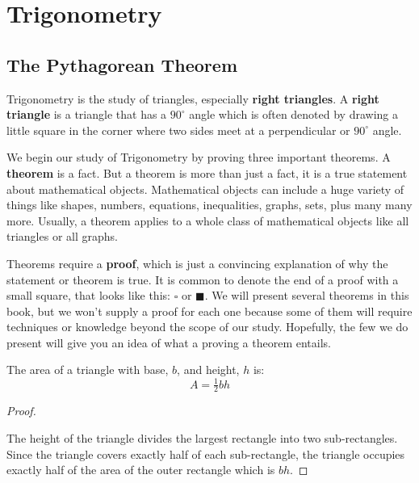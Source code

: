\chapter{Trigonometry}%
\label{chap:trigonometry}

\section{The Pythagorean Theorem}%
\label{sec:pythagorean-thm}

Trigonometry is the study of triangles, especially \textbf{right
  triangles}. A \textbf{right triangle} is a triangle that has a
\(90^{\circ}\) angle which is often denoted by drawing a little square
in the corner where two sides meet at a perpendicular or
\(90^{\circ}\) angle.
\begin{center}
  
\end{center}

We begin our study of Trigonometry by proving three important
theorems. A \textbf{theorem} is a fact. But a theorem is more than
just a fact, it is a true statement about mathematical objects.
Mathematical objects can include a huge variety of things like shapes,
numbers, equations, inequalities, graphs, sets, plus many many more.
Usually, a theorem applies to a whole class of mathematical objects
like all triangles or all graphs.

Theorems require a \textbf{proof}, which is just a convincing
explanation of why the statement or theorem is true. It is common to
denote the end of a proof with a small square, that looks like this:
\(\square\) or \(\blacksquare\). We will present several theorems in
this book, but we won't supply a proof for each one because some of
them will require techniques or knowledge beyond the scope of our
study. Hopefully, the few we do present will give you an idea of what
a proving a theorem entails.

\begin{theorem}
  The area of a triangle with base, \(b\), and height, \(h\) is:
  \begin{equation}
    \label{eq:area-triangle}
    A = \tfrac{1}{2}bh
  \end{equation}
\end{theorem}
\newpage
\begin{proof}
  {~}
  \begin{center}
    
  \end{center}
  The height of the triangle divides the largest rectangle into two
  sub-rectangles. Since the triangle covers exactly half of each
  sub-rectangle, the triangle occupies exactly half of the area of the
  outer rectangle which is \(bh\).
\end{proof}

